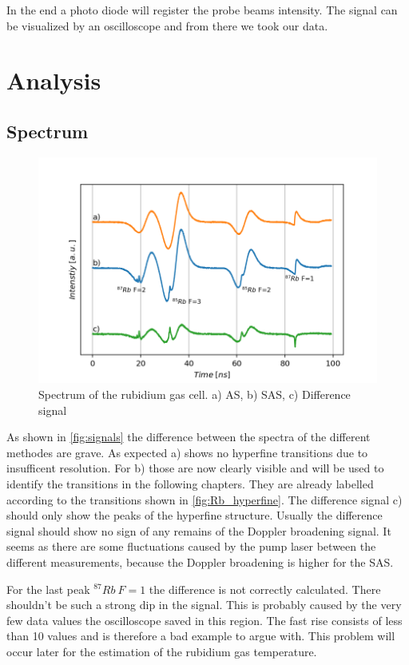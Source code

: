 \documentclass[]{article}
\begin{document}
In the end a photo diode will register the probe beams intensity. The signal can be visualized by an oscilloscope and from there we took our data.



\newpage
\section{Analysis}
\subsection{Spectrum}
\begin{figure}[H]
\centering
\includegraphics[width=.8\textwidth]{Plots/Diff_Signal.png}
\caption{Spectrum of the rubidium gas cell. a) AS, b) SAS, c) Difference signal}
\label{fig:signals}
\end{figure}

As shown in \autoref{fig:signals} the difference between the spectra of the different methodes are grave. As expected a) shows no hyperfine transitions due to insufficent resolution. For b) those are now clearly visible and will be used to identify the transitions in the following chapters. They are already labelled according to the transitions shown in \autoref{fig:Rb_hyperfine}.
The difference signal c) should only show the peaks of the hyperfine structure.
Usually the difference signal should show no sign of any remains of the Doppler broadening signal. It seems as there are some fluctuations caused by the pump laser between the different measurements, because the Doppler broadening is higher for the SAS. 

For the last peak  $^{87}Rb\ F=1$ the difference is not correctly calculated. There shouldn't be such a strong dip in the signal. This is probably caused by the very few data values the oscilloscope saved in this region. The fast rise consists of less than 10 values and is therefore a bad example to argue with. This problem will occur later for the estimation of the rubidium gas temperature.
\end{document}
